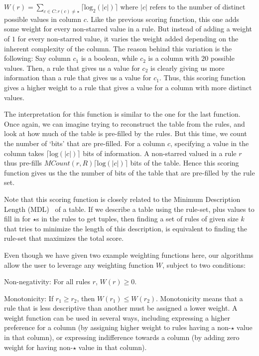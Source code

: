 $W(r) = \sum_{c \in C : r(c) \neq \star} \lceil \text{log}_2(|c|) \rceil$ where $|c|$ refers to the number of distinct possible values in column $c$. Like the previous scoring function, this one adds some weight for every non-starred value in a rule. But instead of adding a weight of $1$ for every non-starred value, it varies the weight added depending on the inherent complexity of the column. The reason behind this variation is the following: Say column $c_1$ is a boolean, while $c_2$ is a column with $20$ possible values. Then, a rule that gives us a value for $c_2$ is clearly giving us more information than a rule that gives us a value for $c_1$. Thus, this scoring function gives a higher weight to a rule that gives a value for a column with more distinct values. 

The interpretation for this function is similar to the one for the last function. Once again, we can imagine trying to reconstruct the table from the rules, and look at how much of the table is pre-filled by the rules. But this time, we count the number of `bits' that are pre-filled. For a column $c$, specifying a value in the column takes $\lceil \text{log}(|c|)\rceil$ bits of information. A non-starred valued in a rule $r$ thus pre-fills $MCount(r,R) \lceil \text{log}(|c|) \rceil$ bits of the table. Hence this scoring function gives us the the number of bits of the table that are pre-filled by the rule set.

Note that this scoring function is closely related to the Minimum Description Length (MDL)~\cite{Grunwald:2007:MDL:1213810} of a table. If we describe a table using the rule-set, plus values to fill in for $\star$s in the rules to get tuples, then finding a set of rules of given size $k$ that tries to minimize the length of this description, is equivalent to finding the rule-set that maximizes the total score. 

\smallskip

Even though we have given two example weighting functions here, our algorithms allow the user to leverage any weighting function $W$, subject to two conditions:
\squishlist
\item Non-negativity: For all rules $r$, $W(r) \geq 0$.
\item Monotonicity: If $r_1 \geq r_2$, then $W(r_1) \leq W(r_2)$. Monotonicity means that a rule that is less descriptive than another must be assigned a lower weight.
\squishend
A weight function can be used in several ways, including expressing a higher preference for a column (by assigning higher weight to rules having a non-$\star$ value in that column), or expressing indifference towards a column (by adding zero weight for having non-$\star$ value in that column).

